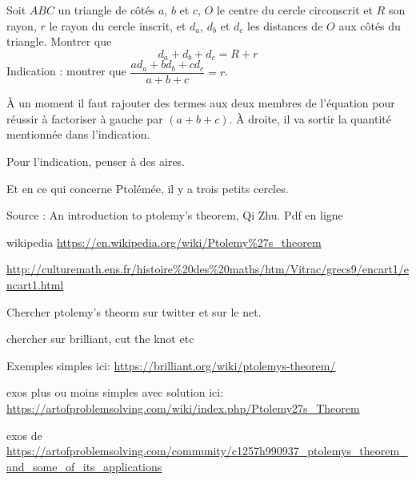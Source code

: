 





\begin{exo}
Soit $ABC$ un triangle de côtés $a$, $b$ et $c$, $O$ le centre du cercle circonscrit et $R$ son rayon, $r$ le rayon du cercle inscrit, et $d_a$, $d_b$ et $d_c$ les distances de $O$ aux côtés du triangle.
Montrer que
\[ d_a+d_b+d_c = R+r\]
Indication : montrer que $\dfrac{ad_a+bd_b+cd_c}{a+b+c}=r$.
\begin{hint}
À un moment il faut rajouter des termes aux deux membres de l'équation pour réussir à factoriser à gauche par $(a+b+c)$. À droite, il va sortir la quantité mentionnée dans l'indication.

Pour l'indication, penser à des aires.

Et en ce qui concerne Ptolémée, il y a trois petits cercles.
\end{hint}
\begin{sol}
Source : An introduction to ptolemy's theorem, Qi Zhu. Pdf en ligne
\end{sol}
\end{exo}



wikipedia \url{https://en.wikipedia.org/wiki/Ptolemy%27s_theorem}

\url{http://culturemath.ens.fr/histoire%20des%20maths/htm/Vitrac/grecs9/encart1/encart1.html}

Chercher ptolemy's theorm sur twitter et sur le net.

chercher sur brilliant, cut the knot etc


Exemples simples ici:
\url{https://brilliant.org/wiki/ptolemys-theorem/}

exos plus ou moins simples avec solution ici:
\url{https://artofproblemsolving.com/wiki/index.php/Ptolemy27s_Theorem}

exos de \url{https://artofproblemsolving.com/community/c1257h990937_ptolemys_theorem_and_some_of_its_applications}




